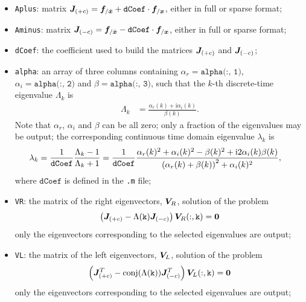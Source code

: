 \begin{itemize}
\item \texttt{Aplus}: 
matrix
$\boldsymbol{J}_{(+c)} = \boldsymbol{f}_{/\dot{\boldsymbol{x}}} + \texttt{dCoef} \cdot \boldsymbol{f}_{/\boldsymbol{x}}$,
either in full or sparse format;

\item \texttt{Aminus}: 
matrix
$\boldsymbol{J}_{(-c)} = \boldsymbol{f}_{/\dot{\boldsymbol{x}}} - \texttt{dCoef} \cdot \boldsymbol{f}_{/\boldsymbol{x}}$,
either in full or sparse format;

\item \texttt{dCoef}: the coefficient used to build the matrices
$\boldsymbol{J}_{(+c)}$ and $\boldsymbol{J}_{(-c)}$;

\item \texttt{alpha}:
an array of three columns containing
$\alpha_r = \texttt{alpha(:, 1)}$,
$\alpha_i = \texttt{alpha(:, 2)}$
and $\beta = \texttt{alpha(:, 3)}$,
such that the $k$-th discrete-time eigenvalue $\Lambda_k$ is
\begin{align}
	\Lambda_k
	&=
	\frac{\alpha_r(k) + \text{i} \alpha_i(k)}{\beta(k)}
	.
\end{align}
Note that $\alpha_r$, $\alpha_i$ and $\beta$ can be all zero;
only a fraction of the eigenvalues may be output;
the corresponding continuous time domain eigenvalue $\lambda_k$ is
\begin{align}
        \label{sec:PROBLEMS:eigenvalues}
	\lambda_k
	&=
	\frac{1}{\texttt{dCoef}}
	\frac{\Lambda_k - 1}{\Lambda_k + 1}
	=
	\frac{1}{\texttt{dCoef}}
	\frac{
		\alpha_r(k)^2
		+
		\alpha_i(k)^2
		-
		\beta(k)^2
		+
		\text{i} 2 \alpha_i(k) \beta(k)
	}{
		\left( \alpha_r(k) + \beta(k) \right)^2 + \alpha_i(k)^2
	}
	,
\end{align}
where $\texttt{dCoef}$ is defined in the \texttt{.m} file;

\item \texttt{VR}: the matrix of the right eigenvectors, $\boldsymbol{V}_R$, solution of the problem
\begin{align*}
	\left( \boldsymbol{J}_{(+c)} - \Lambda(\mathtt{k}) \boldsymbol{J}_{(-c)} \right) \boldsymbol{V}_R(:,\mathtt{k}) = \boldsymbol{0}
\end{align*}
only the eigenvectors corresponding to the selected eigenvalues are output;

\item \texttt{VL}: the matrix of the left eigenvectors, $\boldsymbol{V}_L$, solution of the problem
\begin{align*}
	\left( \boldsymbol{J}_{(+c)}^T - \mathrm{conj}(\Lambda(\mathtt{k})) \boldsymbol{J}_{(-c)}^T \right) \boldsymbol{V}_L(:, \mathtt{k}) = \boldsymbol{0}
\end{align*}
only the eigenvectors corresponding to the selected eigenvalues are output;


\end{itemize}
